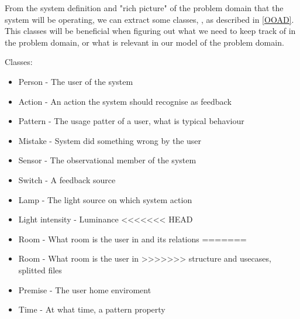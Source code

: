 From the system definition and "rich picture" of the problem domain that the system will be operating, we can extract some classes, , as described in \cref{OOAD}. This classes will be beneficial when figuring out what we need to keep track of in the problem domain, or what is relevant in our model of the problem domain.

Classes:
\begin{itemize}
\item Person - The user of the system
\item Action - An action the system should recognise as feedback
\item Pattern - The usage patter of a user, what is typical behaviour
\item Mistake - System did something wrong by the user
\item Sensor - The observational member of the system
\item Switch - A feedback source
\item Lamp - The light source on which system action
\item Light intensity - Luminance
<<<<<<< HEAD
\item Room - What room is the user in and its relations
=======
\item Room - What room is the user in
>>>>>>> structure and usecases, splitted files
\item Premise - The user home enviroment
\item Time - At what time, a pattern property
\end{itemize}
